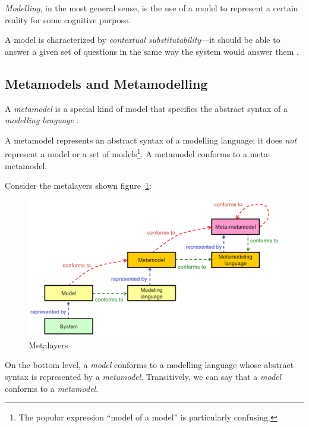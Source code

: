 \textit{Modelling}, in the most general sense, is the use of a model to represent a certain reality for some cognitive purpose.

A model is characterized by \textit{contextual substitutability}---it should be able to answer a given set of questions in the same way the system would answer them \cite{Genova09}.

\subsection{Metamodels and Metamodelling}

A \textit{metamodel} is a special kind of model that specifies the abstract syntax of a \textit{modelling language} \cite{OMG-MDA-Foundation-Model}.

A metamodel represents an abstract syntax of a modelling language; it does \textit{not} represent a model or a set of models\footnote{The popular expression ``model of a model'' is particularly confusing.}.
A metamodel conforms to a meta-metamodel.

Consider the metalayers shown figure~\ref{figure:metalayers}:

\begin{figure}[h]
	\centering
	\includegraphics[width=\textwidth]{images/metalayers}
	\caption{Metalayers \cite{Genova09}}
	\label{figure:metalayers}
\end{figure}

On the bottom level, a \textit{model} conforms to a modelling language whose abstract syntax is represented by a \textit{metamodel}.
Transitively, we can say that a \textit{model} conforms to a \textit{metamodel}.

